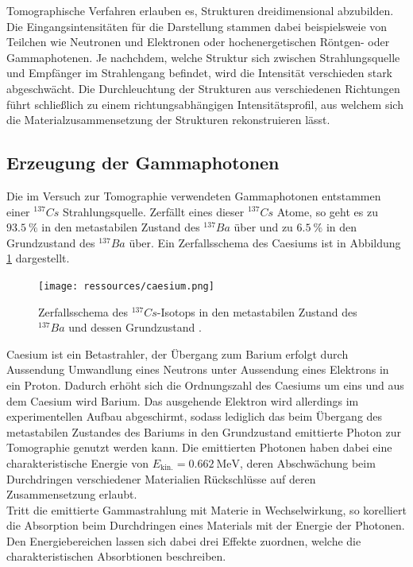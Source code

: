 \noindent Tomographische Verfahren erlauben es, Strukturen dreidimensional abzubilden.
Die Eingangsintensitäten für die Darstellung stammen dabei beispielsweie von
Teilchen wie Neutronen und Elektronen oder hochenergetischen Röntgen- oder
Gammaphotenen. Je nachchdem, welche Struktur sich zwischen Strahlungsquelle und
Empfänger im Strahlengang befindet, wird die Intensität verschieden stark
abgeschwächt. Die Durchleuchtung der Strukturen aus verschiedenen Richtungen
führt schließlich zu einem richtungsabhängigen Intensitätsprofil, aus welchem
sich die Materialzusammensetzung der Strukturen rekonstruieren lässt. \\
\subsection{Erzeugung der Gammaphotonen}
\noindent Die im Versuch zur Tomographie verwendeten Gammaphotonen entstammen
einer $^{137}Cs$ Strahlungsquelle. Zerfällt eines dieser $^{137}Cs$ Atome, so
geht es zu $\SI{93.5}{\percent}$ in den metastabilen Zustand des $^{137}Ba$
über und zu $\SI{6.5}{\percent}$ in den Grundzustand des $^{137}Ba$ über. Ein
Zerfallsschema des Caesiums ist in Abbildung \ref{fig:01} dargestellt.
\begin{figure}
  \centering
  \texttt{[image: ressources/caesium.png]}
  \caption{Zerfallsschema des $^{137}Cs$-Isotops in den metastabilen Zustand des
  $^{137}Ba$ und dessen Grundzustand \cite{gil}.}
  \label{fig:01}
\end{figure}
\noindent Caesium ist ein Betastrahler, der Übergang zum Barium erfolgt durch
Aussendung Umwandlung eines Neutrons unter Aussendung eines Elektrons in ein
Proton. Dadurch erhöht sich die Ordnungszahl des Caesiums um eins und aus dem
Caesium wird Barium. Das ausgehende Elektron wird allerdings im experimentellen
Aufbau abgeschirmt, sodass lediglich das beim Übergang des metastabilen Zustandes
des Bariums in den Grundzustand emittierte Photon zur Tomographie genutzt werden
kann. Die emittierten Photonen haben dabei eine charakteristische Energie von
$E_\text{kin.} = \SI{0.662}{\mega\electronvolt}$, deren Abschwächung beim
Durchdringen verschiedener Materialien Rückschlüsse auf deren Zusammensetzung
erlaubt. \\
\noindent Tritt die emittierte Gammastrahlung mit Materie in Wechselwirkung, so
korelliert die Absorption beim Durchdringen eines Materials mit der Energie der
Photonen. Den Energiebereichen lassen sich dabei drei Effekte zuordnen, welche
die charakteristischen Absorbtionen beschreiben. \\
